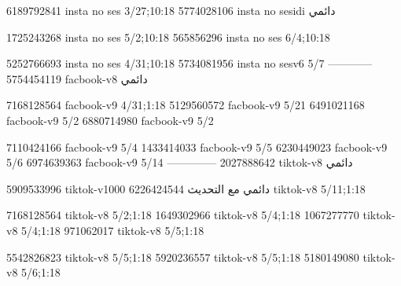 
6189792841 insta no ses
3/27;10:18
5774028106 insta no sesidi
دائمي


1725243268 insta no ses
5/2;10:18
565856296 insta no ses
6/4;10:18

5252766693 insta no ses
4/31;10:18
5734081956 insta no sesv6
5/7
------------
5754454119 facbook-v8
دائمي

7168128564 facbook-v9
4/31;1:18
5129560572 facbook-v9
5/21
6491021168 facbook-v9
5/2
6880714980 facbook-v9
5/2

7110424166 facbook-v9
5/4
1433414033 facbook-v9
5/5
6230449023 facbook-v9
5/6
6974639363 facbook-v9
5/14
--------------
2027888642 tiktok-v8
دائمي

5909533996 tiktok-v1000
دائمي مع التحديث
6226424544 tiktok-v8
5/11;1:18

7168128564 tiktok-v8
5/2;1:18
1649302966 tiktok-v8
5/4;1:18
1067277770 tiktok-v8
5/4;1:18
971062017 tiktok-v8
5/5;1:18

5542826823 tiktok-v8
5/5;1:18
5920236557 tiktok-v8
5/5;1:18
5180149080 tiktok-v8
5/6;1:18
